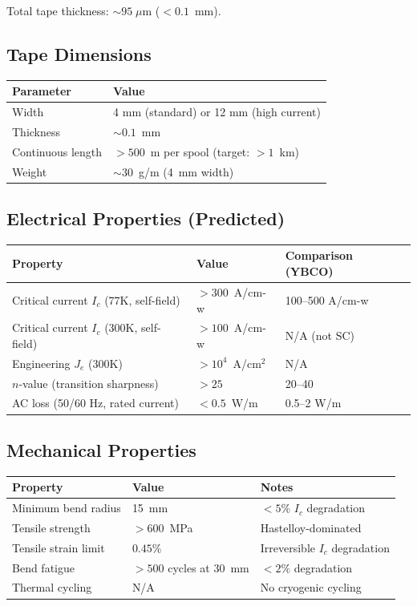 \documentclass[11pt, a4paper]{article}
\begin{document}
Total tape thickness: $\sim 95\;\mu$m ($< 0.1$~mm).

\subsection{Tape Dimensions}

\begin{center}
\begin{tabular}{@{}ll@{}}
\toprule
\textbf{Parameter} & \textbf{Value} \\
\midrule
Width & 4 mm (standard) or 12 mm (high current) \\
Thickness & $\sim 0.1$~mm \\
Continuous length & $> 500$~m per spool (target: $> 1$~km) \\
Weight & $\sim 30$~g/m (4~mm width) \\
\bottomrule
\end{tabular}
\end{center}

\subsection{Electrical Properties (Predicted)}

\begin{center}
\begin{tabular}{@{}lll@{}}
\toprule
\textbf{Property} & \textbf{Value} & \textbf{Comparison (YBCO)} \\
\midrule
Critical current $I_c$ (77K, self-field) & $> 300$~A/cm-w & 100--500 A/cm-w \\
Critical current $I_c$ (300K, self-field) & $> 100$~A/cm-w & N/A (not SC) \\
Engineering $J_e$ (300K) & $> 10^4$~A/cm$^2$ & N/A \\
$n$-value (transition sharpness) & $> 25$ & 20--40 \\
AC loss (50/60 Hz, rated current) & $< 0.5$~W/m & 0.5--2 W/m \\
\bottomrule
\end{tabular}
\end{center}

\subsection{Mechanical Properties}

\begin{center}
\begin{tabular}{@{}lll@{}}
\toprule
\textbf{Property} & \textbf{Value} & \textbf{Notes} \\
\midrule
Minimum bend radius & 15~mm & $< 5\%$ $I_c$ degradation \\
Tensile strength & $> 600$~MPa & Hastelloy-dominated \\
Tensile strain limit & $0.45\%$ & Irreversible $I_c$ degradation \\
Bend fatigue & $> 500$ cycles at 30~mm & $< 2\%$ degradation \\
Thermal cycling & N/A & No cryogenic cycling \\
\bottomrule
\end{tabular}
\end{center}
\end{document}
